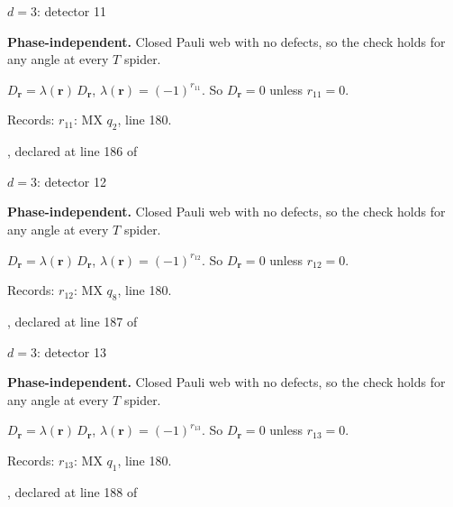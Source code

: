 \label{d3_det011}
{\Large $d=3$: detector 11}\par
\textbf{Phase-independent.} Closed Pauli web with no defects, so the check holds for any angle at every $T$ spider.
\begin{center}
\end{center}
\vspace{-1mm}
$D_{\boldsymbol r}=\lambda(\boldsymbol r)\,D_{\boldsymbol r}$, \quad $\lambda(\boldsymbol r)=(-1)^{r_{11}}$. \qquad So $D_{\boldsymbol r}=0$ unless $r_{11}=0$.
\par\smallskip\begin{minipage}{.98\linewidth}\small Records: $r_{11}$: MX $q_{2}$, line 180.\end{minipage}
\vfill
{\footnotesize\texttt{}, declared at line 186 of \texttt{}}
\newpage

\label{d3_det012}
{\Large $d=3$: detector 12}\par
\textbf{Phase-independent.} Closed Pauli web with no defects, so the check holds for any angle at every $T$ spider.
\begin{center}
\end{center}
\vspace{-1mm}
$D_{\boldsymbol r}=\lambda(\boldsymbol r)\,D_{\boldsymbol r}$, \quad $\lambda(\boldsymbol r)=(-1)^{r_{12}}$. \qquad So $D_{\boldsymbol r}=0$ unless $r_{12}=0$.
\par\smallskip\begin{minipage}{.98\linewidth}\small Records: $r_{12}$: MX $q_{8}$, line 180.\end{minipage}
\vfill
{\footnotesize\texttt{}, declared at line 187 of \texttt{}}
\newpage

\label{d3_det013}
{\Large $d=3$: detector 13}\par
\textbf{Phase-independent.} Closed Pauli web with no defects, so the check holds for any angle at every $T$ spider.
\begin{center}
\end{center}
\vspace{-1mm}
$D_{\boldsymbol r}=\lambda(\boldsymbol r)\,D_{\boldsymbol r}$, \quad $\lambda(\boldsymbol r)=(-1)^{r_{13}}$. \qquad So $D_{\boldsymbol r}=0$ unless $r_{13}=0$.
\par\smallskip\begin{minipage}{.98\linewidth}\small Records: $r_{13}$: MX $q_{1}$, line 180.\end{minipage}
\vfill
{\footnotesize\texttt{}, declared at line 188 of \texttt{}}
\newpage

